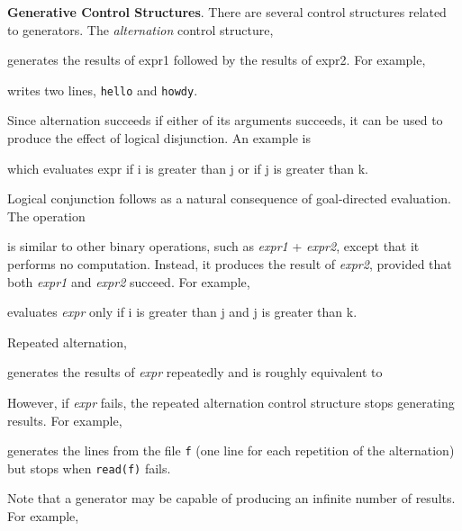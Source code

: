 \textbf{Generative Control Structures}. There are several control
structures related to generators. The \textit{alternation} control
structure,


\noindent
generates the results of expr1 followed by the results of expr2. For example,


\noindent writes two lines, \texttt{hello} and \texttt{howdy}.

Since alternation succeeds if either of its arguments succeeds, it can
be used to produce the effect of logical disjunction. An example is


\noindent
which evaluates expr if i is greater than j or if j is greater than k.

Logical conjunction follows as a natural consequence of goal-directed
evaluation. The operation


\noindent is similar to other binary operations, such as
\textit{expr1} + \textit{expr2}, except that it performs no
computation. Instead, it produces the result of \textit{expr2},
provided that both
\textit{expr1} and \textit{expr2} succeed. For example,


\noindent
evaluates \textit{expr} only if i is greater than j and j is greater than k.

Repeated alternation,


\noindent
generates the results of \textit{expr }repeatedly and is roughly equivalent to


However, if \textit{expr} fails, the repeated alternation control
structure stops generating results. For example,


\noindent generates the lines from the file \texttt{f} (one line for each
repetition of the alternation) but stops when \texttt{read(f)} fails.

Note that a generator may be capable of producing an infinite number
of results. For example,

